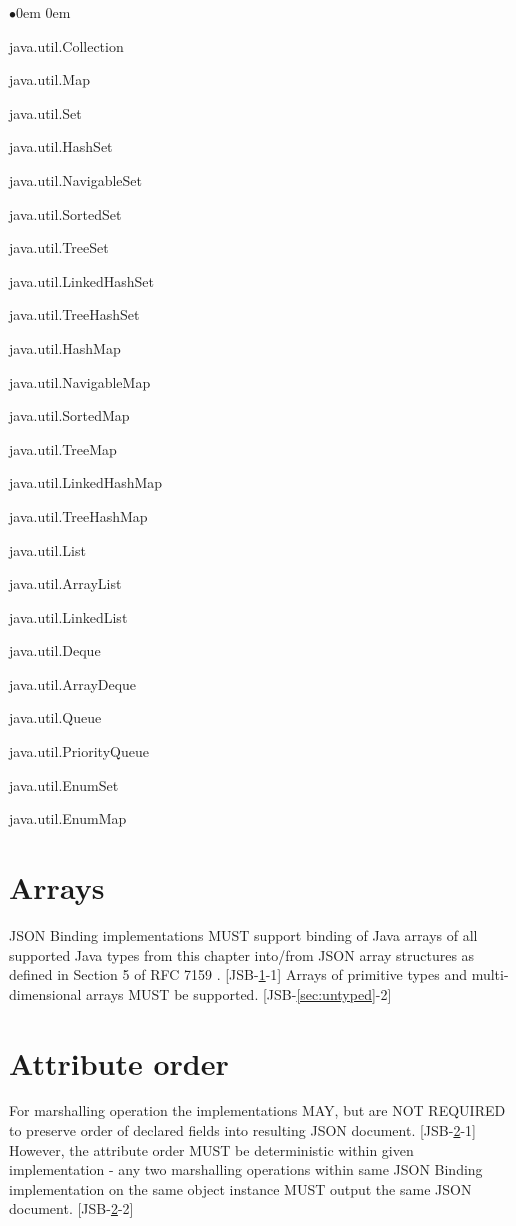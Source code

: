 \begin{list}{$\bullet$}{\parsep 0em  0em}
\item java.util.Collection
\item java.util.Map
\item java.util.Set
\item java.util.HashSet
\item java.util.NavigableSet
\item java.util.SortedSet
\item java.util.TreeSet
\item java.util.LinkedHashSet
\item java.util.TreeHashSet
\item java.util.HashMap
\item java.util.NavigableMap
\item java.util.SortedMap
\item java.util.TreeMap
\item java.util.LinkedHashMap
\item java.util.TreeHashMap
\item java.util.List
\item java.util.ArrayList
\item java.util.LinkedList
\item java.util.Deque
\item java.util.ArrayDeque
\item java.util.Queue
\item java.util.PriorityQueue
\item java.util.EnumSet
\item java.util.EnumMap
\end{list}

\section{Arrays}
\label{sec:arrays}
JSON Binding implementations MUST support binding of Java arrays of all supported Java types from this chapter into/from JSON array structures as defined in Section 5 of RFC 7159 \cite{rfc7159}. [JSB-\ref{sec:arrays}-1] Arrays of primitive types and multi-dimensional arrays MUST be supported. [JSB-\ref{sec:untyped}-2]

\section{Attribute order}
\label{sec:attributes}
For marshalling operation the implementations MAY, but are NOT REQUIRED to preserve order of declared fields into resulting JSON document. [JSB-\ref{sec:attributes}-1] However, the attribute order MUST be deterministic within given implementation - any two marshalling operations within same JSON Binding implementation on the same object instance MUST output the same JSON document. [JSB-\ref{sec:attributes}-2]

